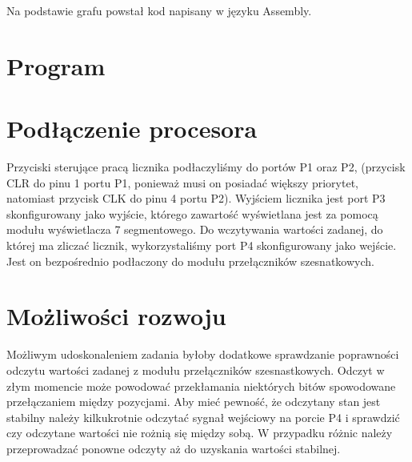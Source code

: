 \documentclass[fleqn]{article}
\begin{document}
Na podstawie grafu powstał kod napisany w języku Assembly.

\pagebreak

\section{Program}



\pagebreak



\pagebreak

\section{Podłączenie procesora}


Przyciski sterujące pracą licznika podłaczyliśmy do portów P1 oraz P2, (przycisk CLR do pinu 1 portu P1, ponieważ musi on posiadać większy priorytet, natomiast przycisk CLK do pinu 4 portu P2). Wyjściem licznika jest port P3 skonfigurowany jako wyjście, którego zawartość wyświetlana jest za pomocą modułu wyświetlacza 7 segmentowego. Do wczytywania wartości zadanej, do której ma zliczać licznik, wykorzystaliśmy port P4 skonfigurowany jako wejście. Jest on bezpośrednio podłaczony do modułu przełączników szesnatkowych.

\section{Możliwości rozwoju}

Możliwym udoskonaleniem zadania byłoby dodatkowe sprawdzanie poprawności odczytu wartości zadanej z modułu przełączników szesnastkowych. Odczyt w złym momencie może powodować przekłamania niektórych bitów spowodowane przełączaniem między pozycjami. Aby mieć pewność, że odczytany stan jest stabilny należy kilkukrotnie odczytać sygnał wejściowy na porcie P4 i sprawdzić czy odczytane wartości nie rożnią się między sobą. W przypadku różnic należy przeprowadzać ponowne odczyty aż do uzyskania wartości stabilnej.
\end{document}
